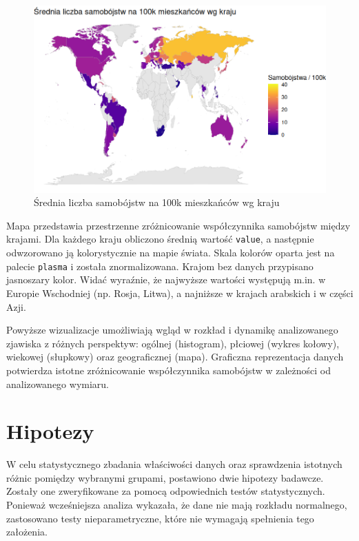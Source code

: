 \documentclass[polish]{article}
\begin{document}
    \begin{figure}[H]
    \centering
    \includegraphics[width=\textwidth]{img/map.png}
    \caption{Średnia liczba samobójstw na 100k mieszkańców wg kraju}
    \end{figure}

    Mapa przedstawia przestrzenne zróżnicowanie współczynnika samobójstw między krajami. Dla każdego kraju obliczono średnią wartość \texttt{value}, a następnie odwzorowano ją kolorystycznie na mapie świata. Skala kolorów oparta jest na palecie \texttt{plasma} i została znormalizowana. Krajom bez danych przypisano jasnoszary kolor. Widać wyraźnie, że najwyższe wartości występują m.in. w Europie Wschodniej (np. Rosja, Litwa), a najniższe w krajach arabskich i w części Azji.

    \bigskip

    Powyższe wizualizacje umożliwiają wgląd w rozkład i dynamikę analizowanego zjawiska z różnych perspektyw: ogólnej (histogram), płciowej (wykres kołowy), wiekowej (słupkowy) oraz geograficznej (mapa). Graficzna reprezentacja danych potwierdza istotne zróżnicowanie współczynnika samobójstw w zależności od analizowanego wymiaru.


    \newpage

    \section{Hipotezy}

    W celu statystycznego zbadania właściwości danych oraz sprawdzenia istotnych różnic pomiędzy wybranymi grupami, postawiono dwie hipotezy badawcze. Zostały one zweryfikowane za pomocą odpowiednich testów statystycznych. Ponieważ wcześniejsza analiza wykazała, że dane nie mają rozkładu normalnego, zastosowano testy nieparametryczne, które nie wymagają spełnienia tego założenia.
\end{document}
